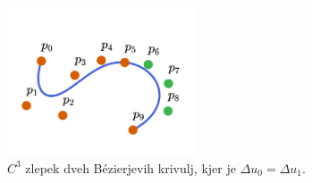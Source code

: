 \documentclass[isrm2, tisk]{fmfdelo}
\begin{document}
    \begin{figure}[h]
        \centering
        \includegraphics[width = 0.50\textwidth]{images/zlepek-c3}
        \caption{$C^3$ zlepek dveh Bézierjevih krivulj, kjer je $\Delta u_0=\Delta u_1$.}
        \label{fig:zlepek-c3}
    \end{figure}
\end{document}
